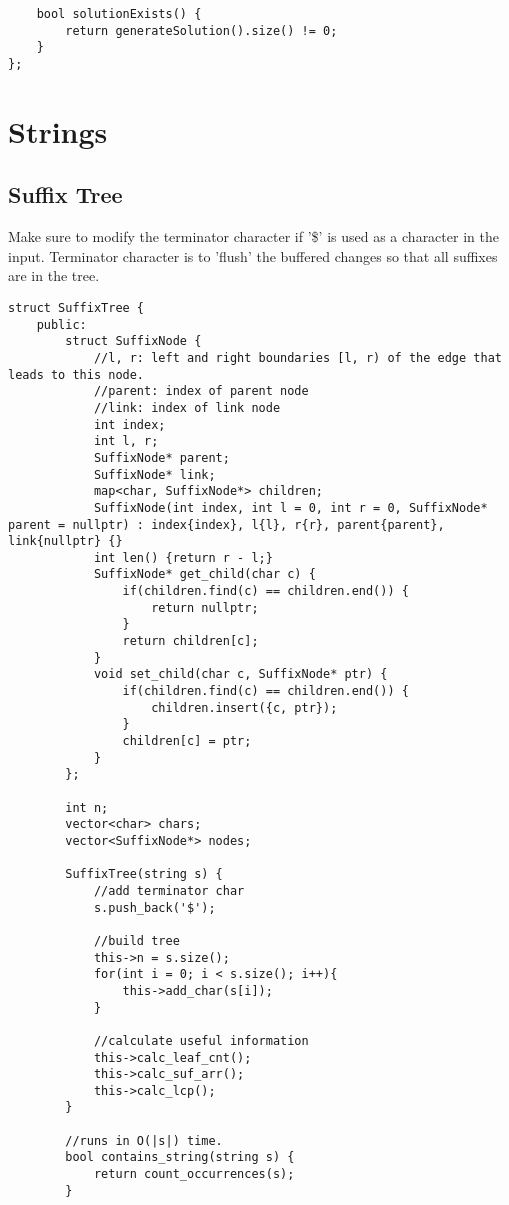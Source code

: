 \documentclass[8pt, headheight=10pt]{scrartcl}
\begin{document}
\begin{multicols*}{3}
\begin{lstlisting}
    bool solutionExists() {
        return generateSolution().size() != 0;
    }
};
\end{lstlisting}

\section{Strings}
\subsection{Suffix Tree}
Make sure to modify the terminator character if '\$' is used as a character in the input. Terminator character is to 'flush' the buffered changes so that all suffixes are in the tree. 
\begin{lstlisting}
struct SuffixTree {
    public:
        struct SuffixNode {
            //l, r: left and right boundaries [l, r) of the edge that leads to this node.   
            //parent: index of parent node
            //link: index of link node
            int index;
            int l, r;
            SuffixNode* parent;
            SuffixNode* link;
            map<char, SuffixNode*> children;
            SuffixNode(int index, int l = 0, int r = 0, SuffixNode* parent = nullptr) : index{index}, l{l}, r{r}, parent{parent}, link{nullptr} {}
            int len() {return r - l;}
            SuffixNode* get_child(char c) {
                if(children.find(c) == children.end()) {
                    return nullptr;
                }
                return children[c];
            }
            void set_child(char c, SuffixNode* ptr) {
                if(children.find(c) == children.end()) {
                    children.insert({c, ptr});
                }
                children[c] = ptr;
            }
        };
        
        int n;
        vector<char> chars;
        vector<SuffixNode*> nodes;

        SuffixTree(string s) {
            //add terminator char
            s.push_back('$');

            //build tree
            this->n = s.size();
            for(int i = 0; i < s.size(); i++){
                this->add_char(s[i]);
            }

            //calculate useful information
            this->calc_leaf_cnt();
            this->calc_suf_arr();
            this->calc_lcp();
        }

        //runs in O(|s|) time. 
        bool contains_string(string s) {
            return count_occurrences(s);
        }


\end{lstlisting}
\end{multicols*}
\end{document}

